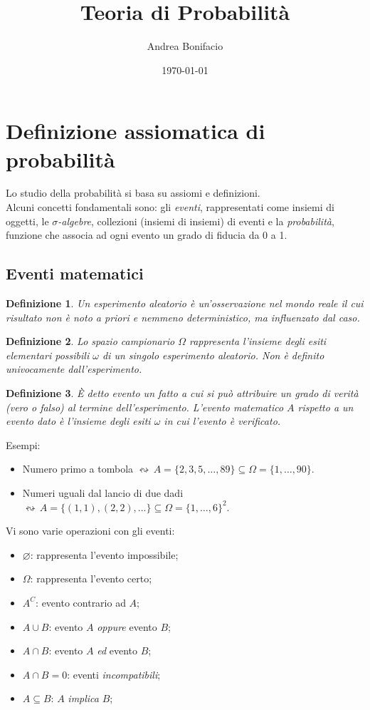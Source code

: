 \documentclass[a4paper,12pt]{article}
\theoremstyle{break}
\newtheorem{definition}{Definizione}[section]
\let\emptyset\varnothing
\numberwithin{equation}{section}
\begin{document}
\title{Teoria di Probabilità}
\author{Andrea Bonifacio}
\date{\today}
\maketitle

\newpage
\section{Definizione assiomatica di probabilità}
Lo studio della probabilità si basa su assiomi e definizioni. \\
Alcuni concetti fondamentali sono: gli \emph{eventi}, rappresentati come insiemi di oggetti, le \emph{$\sigma$-algebre}, collezioni (insiemi di insiemi) di eventi e la \emph{probabilità}, funzione che associa ad ogni evento un grado di fiducia da 0 a 1.
\subsection{Eventi matematici}
\begin{definition}
Un esperimento aleatorio è un'osservazione nel mondo reale il cui risultato non è noto a priori e nemmeno deterministico, ma influenzato dal caso.
\end{definition}
\begin{definition}
Lo spazio campionario $\Omega$ rappresenta l'insieme degli esiti elementari possibili $\omega$ di un singolo esperimento aleatorio. Non è definito univocamente dall'esperimento.
\end{definition}
\begin{definition}
È detto evento un fatto a cui si può attribuire un grado di verità (vero o falso) al termine dell'esperimento. L'evento matematico $A$ rispetto a un evento dato è l'insieme degli esiti $\omega$ in cui l'evento è verificato.
\end{definition}
Esempi:
\begin{itemize}
\item Numero primo a tombola $\leftrightsquigarrow \, A = \{2,3,5,\ldots,89\} \subseteq \Omega =\{1,\ldots, 90\}$.
\item Numeri uguali dal lancio di due dadi $\leftrightsquigarrow \, A = \{(1,1),(2,2),\ldots\} \subseteq \Omega = \{1, \ldots, 6\}^2$.
\end{itemize}
Vi sono varie operazioni con gli eventi:
\begin{itemize}
\item $\emptyset$: rappresenta l'evento impossibile;
\item $\Omega$: rappresenta l'evento certo;
\item $A^C$: evento contrario ad $A$;
\item $A \cup B$: evento $A$ \emph{oppure} evento $B$;
\item $A \cap B$: evento $A$ \emph{ed} evento $B$;
\item $A \cap B = 0$: eventi \emph{incompatibili};
\item $A \subseteq B$: $A$ \emph{implica} $B$;
\end{itemize}
\end{document}
